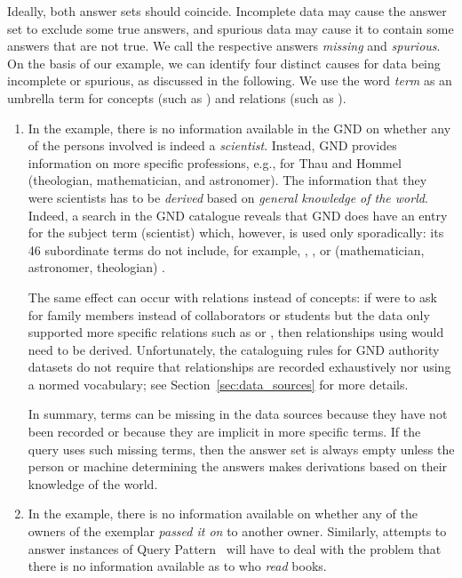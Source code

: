 Ideally, both answer sets should coincide.
Incomplete data may cause the answer set to exclude some true answers,
and spurious data may cause it to contain some answers that are not true.
We call the respective answers \emph{missing} and \emph{spurious}.
On the basis of our example, we can identify four distinct causes for data being incomplete or spurious,
as discussed in the following. We use the word \emph{term} as an umbrella term for concepts (such as )
and relations (such as ).
%
\begin{enumerate}
  \item
    In the example, there is no information available in the \gls{GND} on whether any of the persons involved is indeed
    a \emph{scientist}. Instead, \gls{GND} provides information on more specific professions,
    e.g., for Thau and Hommel (theologian, mathematician, and astronomer).
    The information that they were scientists has to be \emph{derived} based on \emph{general knowledge
    of the world}.
    Indeed, a search in the \gls{GND} catalogue
    reveals that \gls{GND} does have an entry for the subject term  (scientist) \autocite{GNDScientist}
    which, however, is used only sporadically: its 46 subordinate terms do not include, for example,
    , , or  (mathematician, astronomer, theologian)  \autocite{GNDScientistSub}.
    
    The same effect can occur with relations instead of concepts:
    if  were to ask for family members instead of collaborators or students
    but the data only supported more specific relations
    such as  or , then relationships using
     would need to be derived.
    Unfortunately, the cataloguing rules for \gls{GND} authority datasets do not require
    that relationships are recorded exhaustively nor using a normed vocabulary;
    see Section~\ref{sec:data_sources} for more details.
    
    In summary, terms can be missing in the data sources because
    they have not been recorded or because they are implicit in more specific terms.
    If the query uses such missing terms, then the answer set is always empty
    unless the person or machine determining the answers makes derivations based on their
    knowledge of the world.

  \item
    In the example, there is no information available on whether any of the owners of the exemplar
    \emph{passed it on} to another owner. Similarly,
    attempts to answer instances of Query Pattern~ will have to deal
    with the problem that there is no information available as to who \emph{read} books.
    

\end{enumerate}
